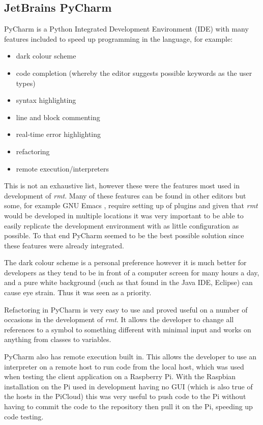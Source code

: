 \subsection{JetBrains PyCharm}
PyCharm \citep{pycharm} is a Python Integrated Development Environment (IDE) with many features included to speed up programming in the language, for example:
\begin{itemize}
	\item dark colour scheme
	\item code completion (whereby the editor suggests possible keywords as the user types)
	\item syntax highlighting
	\item line and block commenting
	\item real-time error highlighting
	\item refactoring
	\item remote execution/interpreters
\end{itemize}
This is not an exhaustive list, however these were the features most used in development of \emph{rmt}.
Many of these features can be found in other editors but some, for example GNU Emacs \citeyearpar{emacs}, require setting up of plugins and given that \emph{rmt} would be developed in multiple locations it was very important to be able to easily replicate the development environment with as little configuration as possible.
To that end PyCharm seemed to be the best possible solution since these features were already integrated.

The dark colour scheme is a personal preference however it is much better for developers as they tend to be in front of a computer screen for many hours a day, and a pure white background (such as that found in the Java IDE, Eclipse) can cause eye strain.
Thus it was seen as a priority.

Refactoring in PyCharm is very easy to use and proved useful on a number of occasions in the development of \emph{rmt}.
It allows the developer to change all references to a symbol to something different with minimal input and works on anything from classes to variables.

PyCharm also has remote execution built in.
This allows the developer to use an interpreter on a remote host to run code from the local host, which was used when testing the client application on a Raspberry Pi.
With the Raspbian installation on the Pi used in development having no GUI (which is also true of the hosts in the PiCloud) this was very useful to push code to the Pi without having to commit the code to the repository then pull it on the Pi, speeding up code testing.